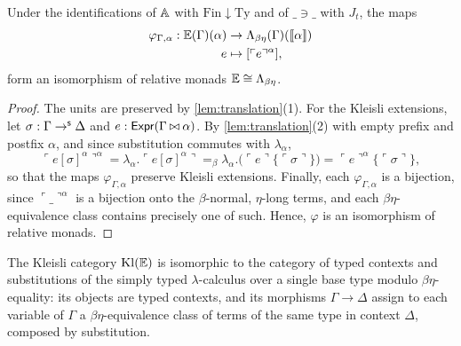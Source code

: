 \begin{proposition}\label{prop:lambda}
    Under the identifications of $\mathbb{A}$ with $\mathrm{Fin}{\downarrow}\mathrm{Ty}$ and of $\_ \ni \_$ with $J_t$, the maps
    \begin{align*}
        \varphi_{\Gamma, \alpha} : \mathbb{E}(\Gamma)(\alpha) &\to \Lambda_{\beta\eta}(\Gamma)(\llbracket \alpha \rrbracket)\\
        e &\mapsto [\ulcorner e \urcorner^\alpha],
    \end{align*}
    form an isomorphism of relative monads $\mathbb{E} \cong \Lambda_{\beta\eta}$.
\end{proposition}

\begin{proof}
    The units are preserved by \cref{lem:translation}(1). For the Kleisli extensions, let $\sigma : \Gamma \to^{\mathsf{s}} \Delta$ and $e : \mathsf{Expr}(\Gamma \mathbin{\bowtie} \alpha)$. By \cref{lem:translation}(2) with empty prefix and postfix $\alpha$, and since substitution commutes with $\lambda_\alpha$,
    \[
    \ulcorner e[\sigma]^\alpha \urcorner^\alpha = \lambda_\alpha. \ulcorner e[\sigma]^\alpha \urcorner =_\beta \lambda_\alpha. \big(\ulcorner e \urcorner\{\ulcorner \sigma \urcorner\}\big) = \ulcorner e \urcorner^\alpha\{\ulcorner \sigma \urcorner\},
    \]
    so that the maps $\varphi_{\Gamma,\alpha}$ preserve Kleisli extensions. Finally, each $\varphi_{\Gamma, \alpha}$ is a bijection, since $\ulcorner \_ \urcorner^\alpha$ is a bijection onto the $\beta$-normal, $\eta$-long terms, and each $\beta\eta$-equivalence class contains precisely one of such. Hence, $\varphi$ is an isomorphism of relative monads.
\end{proof}

\begin{corollary}\label{cor:kleisli}
    The Kleisli category $\mathrm{Kl}(\mathbb{E})$ is isomorphic to the category of typed contexts and substitutions of the simply typed $\lambda$-calculus over a single base type modulo $\beta\eta$-equality: its objects are typed contexts, and its morphisms $\Gamma \to \Delta$ assign to each variable of $\Gamma$ a $\beta\eta$-equivalence class of terms of the same type in context $\Delta$, composed by substitution.
\end{corollary}

